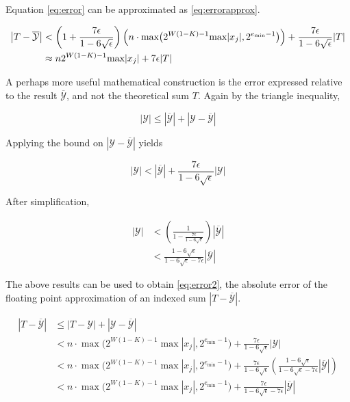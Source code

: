     Equation \eqref{eq:error} can be approximated as \eqref{eq:errorapprox}.

    \begin{align}
      \left|T - \overline{\mathcal{Y}}\right| &< \left(1 + \frac{7\epsilon}{1 - 6\sqrt\epsilon}\right) \Bigl(n \cdot \max\bigl(2^{W (1 - K) - 1} \max|x_j|, 2^{e_{\min} - 1}\bigr)\Bigr) + \frac{7\epsilon}{1 - 6\sqrt\epsilon} |T| \nonumber \\
    &\approx n 2^{W  (1 - K) - 1} \max|x_j| + 7  \epsilon |T|
      \label{eq:errorapprox}
    \end{align}

    A perhaps more useful mathematical construction is the error expressed relative to the result $\overline{\mathcal{Y}}$, and not the theoretical sum $T$. Again by the triangle inequality,

    \begin{equation*}
      |\mathcal{Y}| \leq \left|\overline{\mathcal{Y}}\right| + \left|\mathcal{Y} - \overline{\mathcal{Y}}\right|
    \end{equation*}

    Applying the bound on $|\mathcal{Y} - \overline{\mathcal{Y}}|$ yields

    \begin{equation*}
      |\mathcal{Y}| < \left|\overline{\mathcal{Y}}\right| + \frac{7\epsilon}{1 - 6\sqrt\epsilon}|\mathcal{Y}|
    \end{equation*}

    After simplification,

    \begin{align*}
      |\mathcal{Y}| &< \left(\frac{1}{1 - \frac{7\epsilon}{1 - 6\sqrt\epsilon}}\right)  \left|\overline{\mathcal{Y}}\right| \nonumber \\
      &< \frac{1 - 6 \sqrt\epsilon}{1 - 6 \sqrt \epsilon - 7\epsilon}  \left|\overline{\mathcal{Y}}\right|
    \end{align*}

    The above results can be used to obtain  \eqref{eq:error2}, the absolute error of the floating point approximation of an indexed sum $|T - \overline{\mathcal{Y}}|$.

    \begin{align}
      \left|T - \overline{\mathcal{Y}}\right| &\leq |T - \mathcal{Y}| + \left|\mathcal{Y} - \overline{\mathcal{Y}}\right| \nonumber \\
      &< n \cdot \max\bigl(2^{W  (1 - K) - 1}  \max|x_j|, 2^{e_{\min} - 1}\bigr) + \frac{7\epsilon}{1 - 6\sqrt\epsilon}|\mathcal{Y}| \nonumber \\
      &< n \cdot \max\bigl(2^{W  (1 - K) - 1}  \max|x_j|, 2^{e_{\min} - 1}\bigr) + \frac{7\epsilon}{1 - 6\sqrt\epsilon}\left(\frac{1 - 6 \sqrt\epsilon}{1 - 6 \sqrt \epsilon - 7\epsilon}\left|\overline{\mathcal{Y}}\right|\right) \nonumber \\
      &< n \cdot \max\bigl(2^{W  (1 - K) - 1}  \max|x_j|, 2^{e_{\min} - 1}\bigr) + \frac{7\epsilon}{1 - 6 \sqrt \epsilon - 7\epsilon}\left|\overline{\mathcal{Y}}\right|
      \label{eq:error2}
    \end{align}

